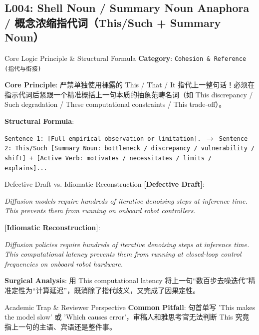 \subsection{L004: Shell Noun / Summary Noun Anaphora / 概念浓缩指代词（This/Such + Summary Noun）}\label{sec:logic:L004}
\begin{ConceptBox}{Core Logic Principle \& Structural Formula}
\textbf{Category}: \texttt{Cohesion \& Reference (指代与衔接)}\par\vspace{3pt}
\textbf{Core Principle}: 严禁单独使用裸露的 This / That / It 指代上一整句话！必须在指示代词后紧跟一个精准概括上一句本质的抽象范畴名词（如 This discrepancy / Such degradation / These computational constraints / This trade-off）。\par\vspace{4pt}
\textbf{Structural Formula}:\par\noindent\texttt{Sentence 1: [Full empirical observation or limitation]. $\to$ Sentence 2: This/Such [Summary Noun: bottleneck / discrepancy / vulnerability / shift] + [Active Verb: motivates / necessitates / limits / explains]...}
\end{ConceptBox}
\begin{ExampleBox}{Defective Draft vs. Idiomatic Reconstruction}
\textbf{\color{TargetHighlight}[Defective Draft]}:\par\textit{Diffusion models require hundreds of iterative denoising steps at inference time. This prevents them from running on onboard robot controllers.}\par\vspace{4pt}
\textbf{\color{AcadNavy}[Idiomatic Reconstruction]}:\par\textit{Diffusion policies require hundreds of iterative denoising steps at inference time. This computational latency prevents them from running at closed-loop control frequencies on onboard robot hardware.}\par\vspace{4pt}
\textbf{Surgical Analysis}: 用 This computational latency 将上一句“数百步去噪迭代”精准定性为“计算延迟”，既消除了指代歧义，又完成了因果定性。
\end{ExampleBox}
\begin{TipBox}{Academic Trap \& Reviewer Perspective}
\textbf{Common Pitfall}: 句首单写 'This makes the model slow' 或 'Which causes error'，审稿人和雅思考官无法判断 This 究竟指上一句的主语、宾语还是整件事。
\end{TipBox}
\vspace{6pt}
